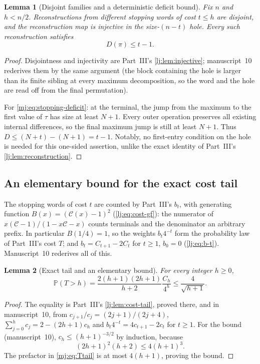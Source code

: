 \documentclass[11pt,a4paper]{article}
\newtheorem{lemma}[lemma]{Lemma}
\theoremstyle{definition}\newaliascnt{definition}{theorem}
\theoremstyle{remark}\newaliascnt{remark}{theorem}
\newcommand{\Cat}{\mathcal C}
\newcommand{\ljP}{\mathbb P}
\begin{document}
\begin{lemma}[Disjoint families and a deterministic deficit bound]
\label{mj:lem:stopping}
Fix $n$ and $h<n/2$. Reconstructions from different stopping words of cost
$t\le h$ are disjoint, and the reconstruction map is injective in the
size-$(n-t)$ hole. Every such reconstruction satisfies
\begin{equation}
 D(\pi)\le t-1.
 \label{mj:eq:stopping-deficit}
\end{equation}
\end{lemma}
\begin{proof}
Disjointness and injectivity are Part~III's \cref{lj:lem:injective};
manuscript~10 rederives them by the same argument (the block containing the
hole is larger than its finite sibling at every maximum decomposition, so
the word and the hole are read off from the final permutation).

For \eqref{mj:eq:stopping-deficit}: at the terminal, the jump from the
maximum to the first value of $\tau$ has size at least $N+1$. Every outer
operation preserves all existing internal differences, so the final maximum
jump is still at least $N+1$. Thus $D\le(N+t)-(N+1)=t-1$. Notably, no
first-entry condition on the hole is needed for this one-sided assertion,
unlike the exact identity of Part~III's \cref{lj:lem:reconstruction}.
\end{proof}

\subsection{An elementary bound for the exact cost tail}
The stopping words of cost $t$ are counted by Part~III's $b_t$, with
generating function $B(x)=(\Cat(x)-1)^2$ (\eqref{lj:eq:cost-gf}): the
numerator of $x(\Cat-1)/(1-x\Cat-x)$ counts terminals and the denominator an
arbitrary prefix. In particular $B(1/4)=1$, so the weights $b_t4^{-t}$ form
the probability law of Part~III's cost $T$; and $b_t=C_{t+1}-2C_t$ for $t\ge1$,
$b_0=0$ (\eqref{lj:eq:b-t}). Manuscript~10 rederives all of this.

\begin{lemma}[Exact tail and an elementary bound]
\label{mj:lem:Ttail}
For every integer $h\ge0$,
\begin{equation}
 \ljP(T>h)=\frac{2(h+1)(2h+1)}{h+2}\frac{C_h}{4^h}
 \le\frac4{\sqrt{h+1}}.
 \label{mj:eq:Ttail}
\end{equation}
\end{lemma}
\begin{proof}
The equality is Part~III's \cref{lj:lem:cost-tail}, proved there, and in
manuscript~10, from $c_{j+1}/c_j=(2j+1)/(2j+4)$,
$\sum_{j=0}^hc_j=2-(2h+1)c_h$ and $b_t4^{-t}=4c_{t+1}-2c_t$ for $t\ge1$.
For the bound (manuscript~10), $c_h\le(h+1)^{-3/2}$ by induction, because
\[
 (2h+1)^2(h+2)\le4(h+1)^3.
\]
The prefactor in \eqref{mj:eq:Ttail} is at most $4(h+1)$, proving the bound.
\end{proof}
\end{document}
